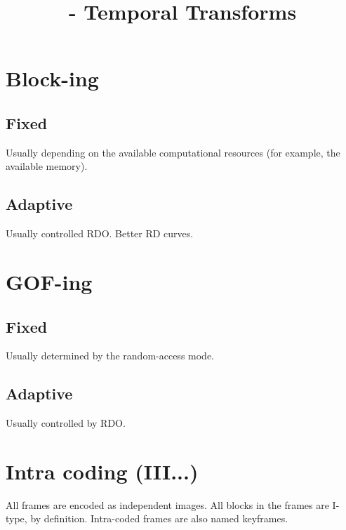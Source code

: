 


\title{\SM{} - Temporal Transforms}

\maketitle
\tableofcontents

\section{Block-ing}



\subsection{Fixed}

Usually depending on the available computational resources (for example, the available memory).

\subsection{Adaptive}

Usually controlled RDO. Better RD curves.

\section{GOF-ing}

\subsection{Fixed}

Usually determined by the random-access mode.

\subsection{Adaptive}

Usually controlled by RDO.

\section{Intra coding (III...)}

All frames are encoded as independent images.  All blocks in the
frames are I-type, by definition. Intra-coded frames are also named
keyframes.


